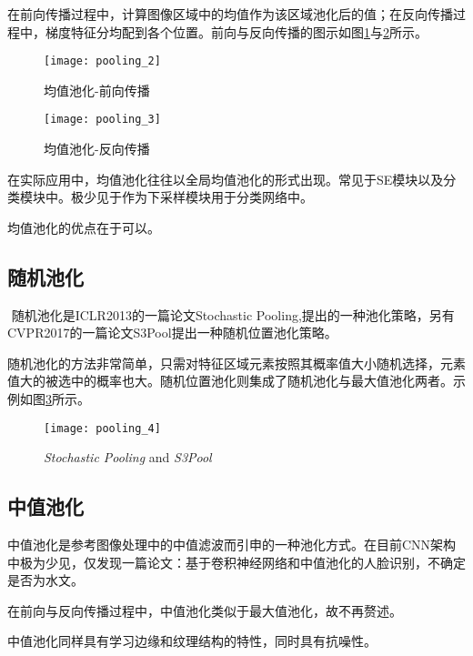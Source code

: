     ​ 在前向传播过程中，计算图像区域中的均值作为该区域池化后的值；在反向传播过程中，梯度特征分均配到各个位置。前向与反向传播的图示如图\ref{fig:12}与\ref{fig:13}所示。
    
    \begin{figure}[!htbp]
        \centering
        \texttt{[image: pooling\_2]}
        \caption{均值池化-前向传播\cite{RN6}}
        \label{fig:12}
    \end{figure}
    \begin{figure}[!htbp]
        \centering
        \texttt{[image: pooling\_3]}
        \caption{均值池化-反向传播}
        \label{fig:13}
    \end{figure}

    在实际应用中，均值池化往往以全局均值池化的形式出现。常见于SE模块以及分类模块中。极少见于作为下采样模块用于分类网络中。
    
    均值池化的优点在于可以。
    
    \subsection{随机池化}
    
    ​ 随机池化是ICLR2013的一篇论文Stochastic Pooling,提出的一种池化策略，另有CVPR2017的一篇论文S3Pool提出一种随机位置池化策略。
    
    ​ 随机池化的方法非常简单，只需对特征区域元素按照其概率值大小随机选择，元素值大的被选中的概率也大。随机位置池化则集成了随机池化与最大值池化两者。示例如图\ref{fig:14}所示。
    
    \begin{figure}[!htbp]
        \centering
        \texttt{[image: pooling\_4]}
        \caption{\textit{Stochastic Pooling} and \textit{S3Pool}}
        \label{fig:14}
    \end{figure}

    \subsection{中值池化}
    
    中值池化是参考图像处理中的中值滤波而引申的一种池化方式。在目前CNN架构中极为少见，仅发现一篇论文：基于卷积神经网络和中值池化的人脸识别\cite{RN7}，不确定是否为水文。
    
    ​在前向与反向传播过程中，中值池化类似于最大值池化，故不再赘述。
    
    ​中值池化同样具有学习边缘和纹理结构的特性，同时具有抗噪性。
    
